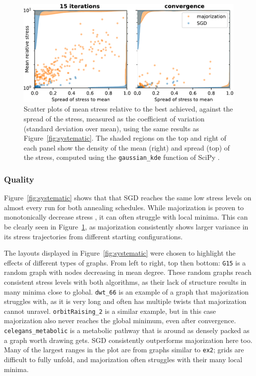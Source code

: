\begin{figure}
  \centering
  \includegraphics[width=.8\textwidth]{stress/systematic_summary.pdf}
  \caption[A summary of the results in Figure~\ref{fig:systematic}]{Scatter plots of mean stress relative to the best achieved, against the spread of the stress, measured as the coefficient of variation (standard deviation over mean), using the same results as Figure~\ref{fig:systematic}.
  The shaded regions on the top and right of each panel show the density of the mean (right) and spread (top) of the stress, computed using the \texttt{gaussian\_kde} function of SciPy \cite{Virtanen2020}.
  }
  \label{fig:systematic_summary}
\end{figure}

\subsubsection{Quality}
\label{quality}
Figure~\ref{fig:systematic} shows that that SGD reaches the same low stress levels on almost every run for both annealing schedules. While majorization is proven to monotonically decrease stress \cite{Gansner2004}, 
it can often struggle with local minima. This can be clearly seen in Figure~\ref{fig:systematic_summary}, as majorization consistently shows larger variance in its stress trajectories from different starting configurations.

The layouts displayed in Figure~\ref{fig:systematic} were chosen to highlight the effects of different types of graphs. From left to right, top then bottom: \texttt{G15} is a random graph with nodes decreasing in mean degree. These random graphs reach consistent stress levels with both algorithms, as their lack of structure results in many minima close to global.
\texttt{dwt\_66} is an example of a graph that majorization struggles with, as it is very long and often has multiple twists that majorization cannot unravel.
\texttt{orbitRaising\_2} is a similar example, but in this case majorization also never reaches the global minimum, even after convergence.
\texttt{celegans\_metabolic} is a metabolic pathway that is around as densely packed as a graph worth drawing gets.
SGD consistently outperforms majorization here too.
Many of the largest ranges in the plot are from graphs similar to \texttt{ex2}; grids are difficult to fully unfold, and majorization often struggles with their many local minima.


